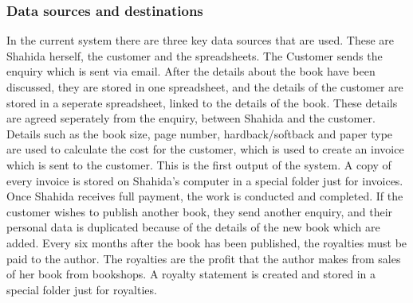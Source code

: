 \subsubsection{Data sources and destinations}
In the current system there are three key data sources that are used. These are Shahida herself, the customer and the spreadsheets. The Customer sends the enquiry which is sent via email. After the details about the book have been discussed, they are stored in one spreadsheet, and the details of the customer are stored in a seperate spreadsheet, linked to the details of the book. These details are agreed seperately from the enquiry, between Shahida and the customer. Details such as the book size, page number, hardback/softback and paper type are used to calculate the cost for the customer, which is used to create an invoice which is sent to the customer. This is the first output of the system. A copy of every invoice is stored on Shahida's computer in a special folder just for invoices. Once Shahida receives full payment, the work is conducted and completed. If the customer wishes to publish another book, they send another enquiry, and their personal data is duplicated because of the details of the new book which are added. Every six months after the book has been published, the royalties must be paid to the author. The royalties are the profit that the author makes from sales of her book from bookshops. A royalty statement is created and stored in a special folder just for royalties.



